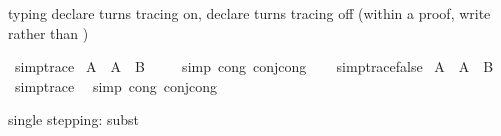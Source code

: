 \begin{isabellebody}
\begin{isamarkuptext}
typing
  declare         turns tracing on,
  declare   turns tracing off
(within a proof, write  rather than )%
\end{isamarkuptext}\isamarkuptrue%
\isamarkupfalse%
\ {\isacharbrackleft}{\kern0pt}{\isacharbrackleft}{\kern0pt}simp{\isacharunderscore}{\kern0pt}trace{\isacharbrackright}{\kern0pt}{\isacharbrackright}{\kern0pt}\isanewline
{}\isamarkupfalse%
\ {\isachardoublequoteopen}A\ {\isasymand}\ {\isacharparenleft}{\kern0pt}A\ {\isasymlongrightarrow}\ B{\isacharparenright}{\kern0pt}{\isachardoublequoteclose}\isanewline
%
\isadelimproof
\ \ \ %
\endisadelimproof
%
\isatagproof
{}\isamarkupfalse%
\ {\isacharparenleft}{\kern0pt}simp\ cong{\isacharcolon}{\kern0pt}\ conj{\isacharunderscore}{\kern0pt}cong{\isacharparenright}{\kern0pt}\isanewline
\ \ \isamarkupfalse%
%
\endisatagproof
{\isafoldproof}%
%
\isadelimproof
\isanewline
%
\endisadelimproof
{}\isamarkupfalse%
\ {\isacharbrackleft}{\kern0pt}{\isacharbrackleft}{\kern0pt}simp{\isacharunderscore}{\kern0pt}trace{\isacharequal}{\kern0pt}false{\isacharbrackright}{\kern0pt}{\isacharbrackright}{\kern0pt}\isanewline
\isanewline
\isanewline
{}\isamarkupfalse%
\ {\isachardoublequoteopen}A\ {\isasymand}\ {\isacharparenleft}{\kern0pt}A\ {\isasymlongrightarrow}\ B{\isacharparenright}{\kern0pt}{\isachardoublequoteclose}\isanewline
%
\isadelimproof
\ \ %
\endisadelimproof
%
\isatagproof
{}\isamarkupfalse%
\ {\isacharbrackleft}{\kern0pt}{\isacharbrackleft}{\kern0pt}simp{\isacharunderscore}{\kern0pt}trace{\isacharbrackright}{\kern0pt}{\isacharbrackright}{\kern0pt}\ \isamarkupfalse%
\ {\isacharparenleft}{\kern0pt}simp\ cong{\isacharcolon}{\kern0pt}\ conj{\isacharunderscore}{\kern0pt}cong{\isacharparenright}{\kern0pt}\isanewline
\ \ \isamarkupfalse%
%
\endisatagproof
{\isafoldproof}%
%
\isadelimproof
%
\endisadelimproof
%
\begin{isamarkuptext}%
single stepping: subst%
\end{isamarkuptext}\isamarkuptrue%

\end{isabellebody}
